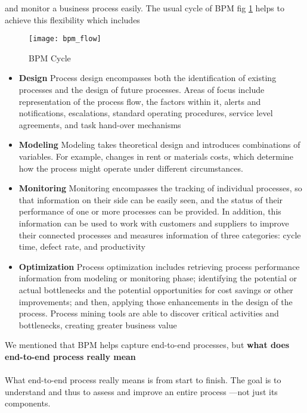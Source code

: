 and monitor a business process easily. The usual cycle of BPM fig \ref{fig:bpm_flow} helps to achieve this
flexibility which includes
\begin{figure}[h]
    \texttt{[image: bpm\_flow]}
    \centering
    \caption{BPM Cycle}
    \label{fig:bpm_flow}
\end{figure}
\begin{itemize}
    \item \textbf{Design} Process design encompasses both the identification of existing processes and the
    design of future processes. Areas of focus include representation of the process flow, the
    factors within it, alerts and notifications, escalations, standard operating procedures, service
    level agreements, and task hand-over mechanisms
    \item \textbf{Modeling} Modeling takes theoretical design and introduces combinations of variables. For
    example, changes in rent or materials costs, which determine how the process might operate
    under different circumstances.
    \item \textbf{Monitoring} Monitoring encompasses the tracking of individual processes, so that
    information on their side can be easily seen, and the status of their performance of one or
    more processes can be provided. In addition, this information can be used to work with
    customers and suppliers to improve their connected processes and measures information of
    three categories: cycle time, defect rate, and productivity
    \item \textbf{Optimization} Process optimization includes retrieving process performance information
    from modeling or monitoring phase; identifying the potential or actual bottlenecks and the
    potential opportunities for cost savings or other improvements; and then, applying those
    enhancements in the design of the process. Process mining tools are able to discover critical
    activities and bottlenecks, creating greater business value
    
\end{itemize}



We mentioned that BPM helps capture end-to-end processes, but \textbf{what does end-to-end process really
mean}\\\\
What end-to-end process really means is from start to finish. The goal is to understand and thus to assess and improve an entire process —not just its components.
\\\\

